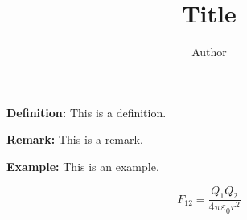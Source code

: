 \documentclass[11pt, a4paper]{article}
\title{Title}
\author{Author}
\begin{document}
\maketitle

\textbf{Definition:} This is a definition.

\textbf{Remark:} This is a remark.

\textbf{Example:} This is an example.

\begin{equation}
    F_{12}=\frac{Q_1Q_2}{4\pi\varepsilon_0r^2}
\end{equation}
\end{document}
